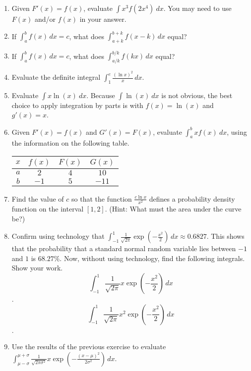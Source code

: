 \documentclass{article}
\begin{document}
\begin{enumerate}
                    \item Given $F'(x)=f(x)$, evaluate $\displaystyle \int x^3f(2x^4)\ dx$. You may need to use $F(x)$ and/or $f(x)$ in your answer.
                    \item If $\displaystyle \int_a^b f(x)\,dx = c$, what does 
                    $\displaystyle \int_{a+k}^{b+k} f(x-k)\,dx$ equal? 
                    \item If $\displaystyle \int_a^b f(x)\,dx = c$, what does 
                    $\displaystyle \int_{a/k}^{b/k} f(kx)\,dx$ equal?
                    \item Evaluate the definite integral 
                    $\displaystyle \int_{1}^{e} \frac{(\ln{x})^2}{x}\,dx$.
                    \item Evaluate $\displaystyle \int x\ln(x)\ dx$.  Because $\int \ln(x)\ dx$ is not obvious, the best choice to apply integration by parts is with $f(x)=\ln(x)$ and $g'(x)=x$.
                    \item Given $F'(x)=f(x)$ and $G'(x)=F(x)$, evaluate $\displaystyle \int_a^b xf(x)\ dx$, using the information on the following table. \\
                        \begin{center}
                        \begin{tabular}{|c|c|c|c|}
                        \hline
                        $x$ & $f(x)$ & $F(x)$ & $G(x)$ \\
                        \hline
                        $a$ & $2$ & $4$ & $10$ \\
                        \hline
                        $b$ & $-1$ & $5$ & $-11$ \\
                        \hline 
                        \end{tabular}
                        \end{center}
                        \medskip
                        
                    \item Find the value of $c$ so that the function 
                    $\displaystyle \frac{c\ln{x}}{x^2}$ defines a probability density function on the interval $[1,2]$. (Hint: What must the area under the curve be?)
                    
                    \item Confirm using technology that $\displaystyle \int_{-1}^{1} \frac{1}{\sqrt{2\pi}} \exp\left(-\frac{x^2}{2}\right)\,dx \approx 0.6827$. This shows that the probability that a standard normal random variable lies between $-1$ and $1$ is $68.27\%$. Now, without using technology, find the following integrals. Show your work.
                    $$\displaystyle \int_{-1}^{1} \frac{1}{\sqrt{2\pi}}x \exp\left(-\frac{x^2}{2}\right)\,dx$$.
                    $$\displaystyle \int_{-1}^{1} \frac{1}{\sqrt{2\pi}}x^2 \exp\left(-\frac{x^2}{2}\right)\,dx$$.
                    \item Use the results of the previous exercise to evaluate $\displaystyle \int_{\mu-\sigma}^{\mu+\sigma} \frac{1}{\sqrt{2\pi \sigma^2}}x \exp\left(-\frac{(x-\mu)^2}{2\sigma^2}\right)\,dx$. 
                    

\end{enumerate}
\end{document}
